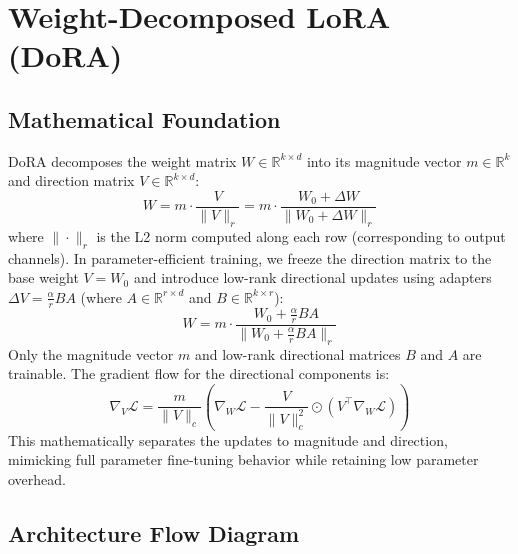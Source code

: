 \documentclass{article}
\begin{document}
\newpage
\section{Weight-Decomposed LoRA (DoRA)}

\subsection{Mathematical Foundation}
DoRA decomposes the weight matrix $W \in \mathbb{R}^{k \times d}$ into its magnitude vector $m \in \mathbb{R}^k$ and direction matrix $V \in \mathbb{R}^{k \times d}$:
\begin{equation}
  W = m \cdot \frac{V}{\|V\|_r} = m \cdot \frac{W_0 + \Delta W}{\|W_0 + \Delta W\|_r}
\end{equation}
where $\|\cdot\|_r$ is the L2 norm computed along each row (corresponding to output channels). In parameter-efficient training, we freeze the direction matrix to the base weight $V = W_0$ and introduce low-rank directional updates using adapters $\Delta V = \frac{\alpha}{r} B A$ (where $A \in \mathbb{R}^{r \times d}$ and $B \in \mathbb{R}^{k \times r}$):
\begin{equation}
  W = m \cdot \frac{W_0 + \frac{\alpha}{r} B A}{\|W_0 + \frac{\alpha}{r} B A\|_r}
\end{equation}
Only the magnitude vector $m$ and low-rank directional matrices $B$ and $A$ are trainable.
The gradient flow for the directional components is:
\begin{equation}
  \nabla_V \mathcal{L} = \frac{m}{\|V\|_c} \left( \nabla_W \mathcal{L} - \frac{V}{\|V\|_c^2} \odot \left( V^\top \nabla_W \mathcal{L} \right) \right)
\end{equation}
This mathematically separates the updates to magnitude and direction, mimicking full parameter fine-tuning behavior while retaining low parameter overhead.

\subsection{Architecture Flow Diagram}
\end{document}
